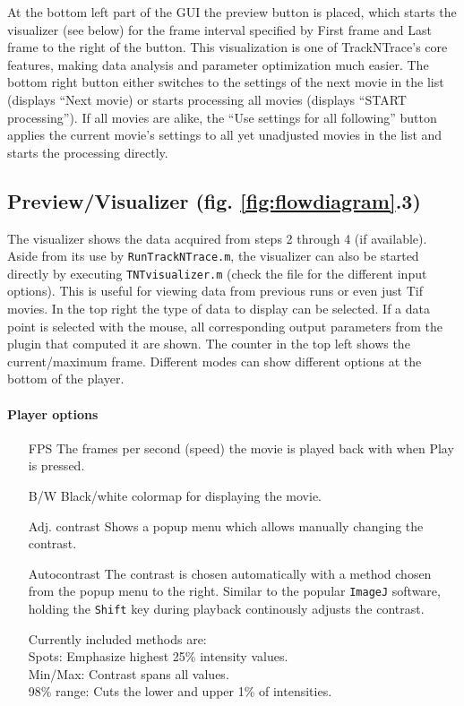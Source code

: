 \documentclass[11pt,onside]{report}
\numberwithin{equation}{chapter}
\begin{document}
At the bottom left part of the GUI the preview button is placed, which starts the visualizer (see below) for the frame interval specified by   \textsf{First frame} and \textsf{Last frame} to the right of the button. This visualization is one of TrackNTrace's core features, making data analysis and parameter optimization much easier. The bottom right button either switches to the settings of the next movie in the list (displays ``\textsf{Next movie}) or starts processing all movies (displays ``\textsf{START processing}''). If all movies are alike, the ``\textsf{Use settings for all following}'' button applies the current movie's settings to all yet unadjusted movies in the list and starts the processing directly.\\[10pt]

\subsection*{Preview/Visualizer (fig. \ref{fig:flowdiagram}.3)}
The visualizer shows the data acquired from steps 2 through 4 (if available). Aside from its use by \texttt{RunTrackNTrace.m}, the visualizer can also be started directly by executing \texttt{TNTvisualizer.m} (check the file for the different input options). This is useful for viewing data from previous runs or even just Tif movies. In the top right the type of data to display can be selected. If a data point is selected with the mouse, all corresponding output parameters from the plugin that computed it are shown. The counter in the top left shows the current/maximum frame. Different modes can show different options at the bottom of the player.

\paragraph{Player options}
\begin{itemize}[leftmargin=3cm]
\item[\textsf{FPS}] The frames per second (speed) the movie is played back with when \textsf{Play} is pressed.
\item[\textsf{B/W}] Black/white colormap for displaying the movie.
\item[\textsf{Adj. contrast}] Shows a popup menu which allows manually changing the contrast.
\item[\textsf{Autocontrast}] The contrast is chosen automatically with a method chosen from the popup menu to the right. Similar to the popular \texttt{ImageJ} software, holding the \texttt{Shift} key during playback continously adjusts the contrast.
\item[] Currently included methods are: \\\hspace*{0.35cm}Spots: Emphasize highest 25\% intensity values.\\\hspace*{0.35cm}Min/Max: Contrast spans all values.\\\hspace*{0.35cm}98\% range: Cuts the lower and upper 1\% of intensities. 
\end{itemize} 
\end{document}
